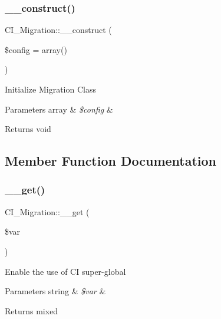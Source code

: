 \subsubsection{\texorpdfstring{\+\_\+\+\_\+construct()}{\_\_construct()}}
{\footnotesize\ttfamily C\+I\+\_\+\+Migration\+::\+\_\+\+\_\+construct (\begin{DoxyParamCaption}\item[{}]{\$config = {\ttfamily array()} }\end{DoxyParamCaption})}

Initialize Migration Class


\begin{DoxyParams}[1]{Parameters}
array & {\em \$config} & \\
\hline
\end{DoxyParams}
\begin{DoxyReturn}{Returns}
void 
\end{DoxyReturn}


\subsection{Member Function Documentation}
\mbox{\label{class_c_i___migration_a30536b98b054d7f54ca762040483c999}} 
\subsubsection{\texorpdfstring{\+\_\+\+\_\+get()}{\_\_get()}}
{\footnotesize\ttfamily C\+I\+\_\+\+Migration\+::\+\_\+\+\_\+get (\begin{DoxyParamCaption}\item[{}]{\$var }\end{DoxyParamCaption})}

Enable the use of CI super-\/global


\begin{DoxyParams}[1]{Parameters}
string & {\em \$var} & \\
\hline
\end{DoxyParams}
\begin{DoxyReturn}{Returns}
mixed 
\end{DoxyReturn}
\mbox{\label{class_c_i___migration_aea1f69e00121f071ed5991fdb63e1eb4}} 
